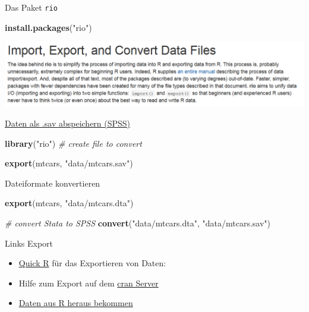 \documentclass[ignorenonframetext,]{beamer}
\newenvironment{Shaded}{}{}
\newcommand{\KeywordTok}[1]{\textcolor[rgb]{0.00,0.44,0.13}{\textbf{{#1}}}}
\newcommand{\StringTok}[1]{\textcolor[rgb]{0.25,0.44,0.63}{{#1}}}
\newcommand{\CommentTok}[1]{\textcolor[rgb]{0.38,0.63,0.69}{\textit{{#1}}}}
\newcommand{\NormalTok}[1]{{#1}}
\begin{document}
\begin{frame}[fragile]{Das Paket \texttt{rio}}

\begin{Shaded}
\begin{Highlighting}[]
\KeywordTok{install.packages}\NormalTok{(}\StringTok{"rio"}\NormalTok{)}
\end{Highlighting}
\end{Shaded}

\includegraphics{./tex2pdf.956/ac65f614039096ed31ca6b9fb206c3472a6ba9cb.png}

\end{frame}

\begin{frame}[fragile]{\href{https://cran.r-project.org/web/packages/rio/vignettes/rio.html}{Daten
als .sav abspeichern (SPSS)}}

\begin{Shaded}
\begin{Highlighting}[]
\KeywordTok{library}\NormalTok{(}\StringTok{"rio"}\NormalTok{)}
\CommentTok{# create file to convert}

\KeywordTok{export}\NormalTok{(mtcars, }\StringTok{"data/mtcars.sav"}\NormalTok{)}
\end{Highlighting}
\end{Shaded}

\end{frame}

\begin{frame}[fragile]{Dateiformate konvertieren}

\begin{Shaded}
\begin{Highlighting}[]
\KeywordTok{export}\NormalTok{(mtcars, }\StringTok{"data/mtcars.dta"}\NormalTok{)}

\CommentTok{# convert Stata to SPSS}
\KeywordTok{convert}\NormalTok{(}\StringTok{"data/mtcars.dta"}\NormalTok{, }\StringTok{"data/mtcars.sav"}\NormalTok{)}
\end{Highlighting}
\end{Shaded}

\end{frame}

\begin{frame}{Links Export}

\begin{itemize}
\item
  \href{http://www.statmethods.net/input/exportingdata.html}{Quick R}
  für das Exportieren von Daten:
\item
  Hilfe zum Export auf dem
  \href{http://cran.r-project.org/doc/manuals/r-release/R-data.pdf}{cran
  Server}
\item
  \href{https://www.stat.ubc.ca/~jenny/STAT545A/block05_getNumbersOut.html}{Daten
  aus R heraus bekommen}
\end{itemize}

\end{frame}
\end{document}
